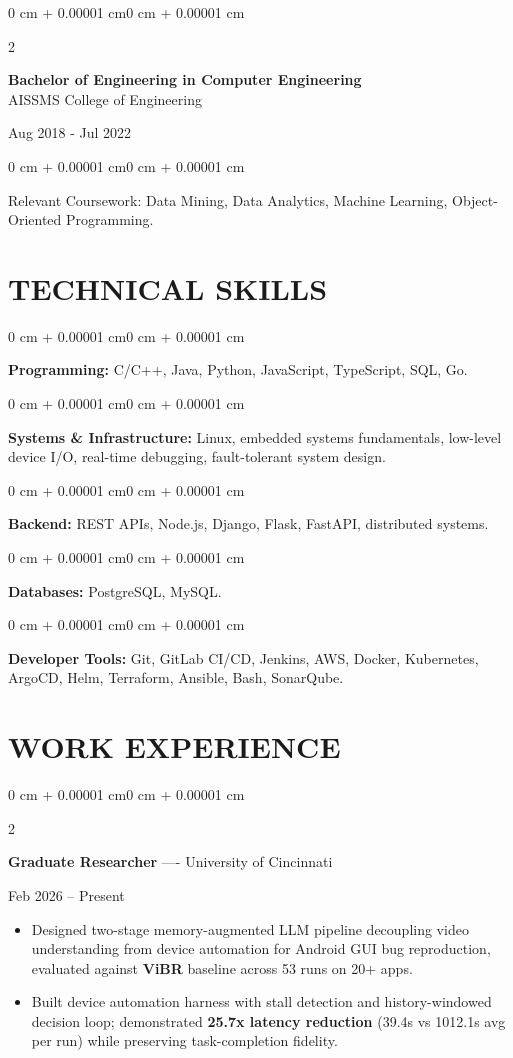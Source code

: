 \documentclass[10pt, letterpaper]{article}
\newenvironment{highlights}{
    \begin{itemize}[
        topsep=0.10 cm,
        parsep=0.06 cm,
        partopsep=0pt,
        itemsep=0.06 cm,
        leftmargin=12pt
    ]
}{
    \end{itemize}
}
\newenvironment{onecolentry}{
    \begin{adjustwidth}{0 cm + 0.00001 cm}{0 cm + 0.00001 cm}
}{
    \end{adjustwidth}
}
\newenvironment{twocolentry}[2][]{
    \onecolentry
    \def\secondColumn{#2}
    \setcolumnwidth{\fill, 4.5 cm}
    \begin{paracol}{2}
}{
    \switchcolumn \raggedleft \secondColumn
    \end{paracol}
    \endonecolentry
}
\begin{document}
\begin{twocolentry}{
    Aug 2018 - Jul 2022
}
    \textbf{Bachelor of Engineering in Computer Engineering} \\
    AISSMS College of Engineering
\end{twocolentry}
\begin{onecolentry}
Relevant Coursework: Data Mining, Data Analytics, Machine Learning, Object-Oriented Programming.
\end{onecolentry}
\section{TECHNICAL SKILLS}
\begin{onecolentry}
\textbf{Programming:} C/C++, Java, Python, JavaScript, TypeScript, SQL, Go.
\end{onecolentry}
\vspace{0.06 cm}
\begin{onecolentry}
\textbf{Systems \& Infrastructure:} Linux, embedded systems fundamentals, low-level device I/O, real-time debugging, fault-tolerant system design.
\end{onecolentry}
\vspace{0.06 cm}
\begin{onecolentry}
\textbf{Backend:} REST APIs, Node.js, Django, Flask, FastAPI, distributed systems.
\end{onecolentry}
\vspace{0.06 cm}
\begin{onecolentry}
\textbf{Databases:} PostgreSQL, MySQL.
\end{onecolentry}
\vspace{0.06 cm}
\begin{onecolentry}
\textbf{Developer Tools:} Git, GitLab CI/CD, Jenkins, AWS, Docker, Kubernetes, ArgoCD, Helm, Terraform, Ansible, Bash, SonarQube.
\end{onecolentry}

\section{WORK EXPERIENCE}
\begin{twocolentry}{Feb 2026 -- Present}
\textbf{Graduate Researcher} ---- University of Cincinnati
\end{twocolentry}
\begin{highlights}
  \item Designed two-stage memory-augmented LLM pipeline decoupling video understanding from device automation for Android GUI bug reproduction, evaluated against \textbf{ViBR} baseline across 53 runs on 20+ apps.
  \item Built device automation harness with stall detection and history-windowed decision loop; demonstrated \textbf{25.7x latency reduction} (39.4s vs 1012.1s avg per run) while preserving task-completion fidelity.
\end{highlights}
\end{document}

